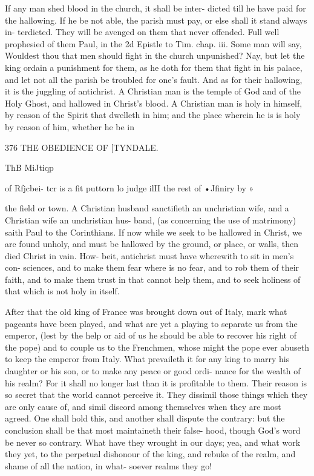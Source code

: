 \documentclass{custom}
\begin{document}
{If any man shed blood in the church, it shall be inter- 
dicted till he have paid for the hallowing. If he be not 
able, the parish must pay, or else shall it stand always in- 
terdicted. They will be avenged on them that never 
offended. Full well prophesied of them Paul, in the 
2d Epistle to Tim. chap. iii. Some man will say, Wouldest 
thou that men should fight in the church unpunished? Nay, 
but let the king ordain a punishment for them, as he doth 
for them that fight in his palace, and let not all the parish 
be troubled for one's fault. And as for their hallowing, it 
is the juggling of antichrist. A Christian man is the 
temple of God and of the Holy Ghost, and hallowed in 
Christ's blood. A Christian man is holy in himself, by 
reason of the Spirit that dwelleth in him; and the place 
wherein he is is holy by reason of him, whether he be in 


376
THE OBEDIENCE OF
[TYNDALE.

ThB MiJtiqp 

of Rfjcbei- 
tcr is a fit 
puttorn lo 
judge ilII 
the rest of 
•Jfiniry by » 

the field or town. A Christian husband sanctifieth an 
unchristian wife, and a Christian wife an unchristian hus- 
band, (as concerning the use of matrimony) saith Paul to 
the Corinthians. If now while we seek to be hallowed in 
Christ, we are found unholy, and must be hallowed by the 
ground, or place, or walls, then died Christ in vain. How- 
beit, antichrist must have wherewith to sit in men's con- 
sciences, and to make them fear where is no fear, and 
to rob them of their faith, and to make them trust in 
that cannot help them, and to seek holiness of that which 
is not holy in itself. 

After that the old king of France was brought down out 
of Italy, mark what pageants have been played, and what 
are yet a playing to separate us from the emperor, (lest by 
the help or aid of us he should be able to recover his right 
of the pope) and to couple us to the Frenchmen, whose 
might the pope ever abuseth to keep the emperor from 
Italy. What prevaileth it for any king to marry his 
daughter or his son, or to make any peace or good ordi- 
nance for the wealth of his realm? For it shall no longer 
last than it is profitable to them. Their reason is so secret 
that the world cannot perceive it. They dissimil those 
things which they are only cause of, and simil discord 
among themselves when they are most agreed. One shall 
hold this, and another shall dispute the contrary: but 
the conclusion shall be that most maintaineth their false- 
hood, though God's word be never so contrary. What 
have they wrought in our days; yea, and what work 
they yet, to the perpetual dishonour of the king, and 
rebuke of the realm, and shame of all the nation, in what- 
soever realms they go! 

}
\end{document}

